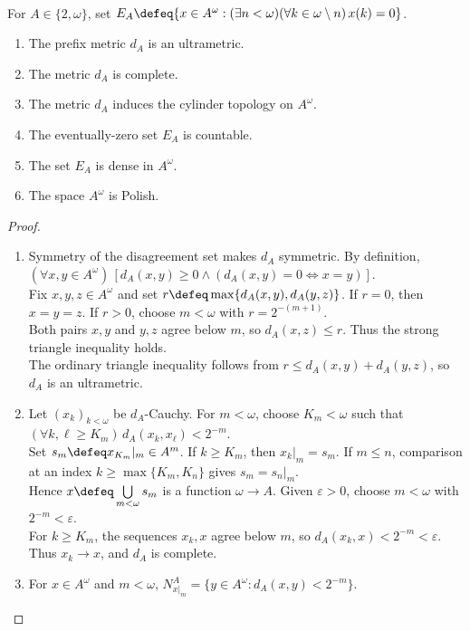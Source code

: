 \begin{theorem} \label{thm:baire-and-cantor-spaces-are-polish} \\
For $A\in\{2,\omega\}$, set $E_A\defeq\{x\in A^\omega:(\exists n<\omega)(\forall k\in\omega\setminus n)\,x(k)=0\}$.
\begin{enumerate}[label=(\roman*)]
\setlength{\itemsep}{0pt}
\item The prefix metric $d_A$ is an ultrametric.
\item The metric $d_A$ is complete.
\item The metric $d_A$ induces the cylinder topology on $A^\omega$.
\item The eventually-zero set $E_A$ is countable.
\item The set $E_A$ is dense in $A^\omega$.
\item The space $A^\omega$ is Polish.
\end{enumerate}
\begin{proof}
\begin{enumerate}[label=(\roman*)]
\setlength{\itemsep}{0pt}
\item Symmetry of the disagreement set makes $d_A$ symmetric. By definition, $(\forall x,y\in A^\omega)\,[d_A(x,y)\geq0\land(d_A(x,y)=0\Longleftrightarrow x=y)]$.\\
Fix $x,y,z\in A^\omega$ and set $r\defeq\max\{d_A(x,y),d_A(y,z)\}$. If $r=0$, then $x=y=z$. If $r>0$, choose $m<\omega$ with $r=2^{-(m+1)}$.\\
Both pairs $x,y$ and $y,z$ agree below $m$, so $d_A(x,z)\leq r$. Thus the strong triangle inequality holds.\\
The ordinary triangle inequality follows from $r\leq d_A(x,y)+d_A(y,z)$, so $d_A$ is an ultrametric.
\item Let $(x_k)_{k<\omega}$ be $d_A$-Cauchy. For $m<\omega$, choose $K_m<\omega$ such that $(\forall k,\ell\geq K_m)\,d_A(x_k,x_\ell)<2^{-m}$.\\
Set $s_m\defeq x_{K_m}|_m\in A^m$. If $k\geq K_m$, then $x_k|_m=s_m$. If $m\leq n$, comparison at an index $k\geq\max\{K_m,K_n\}$ gives $s_m=s_n|_m$.\\
Hence $x\defeq\bigcup\limits_{m<\omega}s_m$ is a function $\omega\to A$. Given $\varepsilon>0$, choose $m<\omega$ with $2^{-m}<\varepsilon$.\\
For $k\geq K_m$, the sequences $x_k,x$ agree below $m$, so $d_A(x_k,x)<2^{-m}<\varepsilon$. Thus $x_k\to x$, and $d_A$ is complete.
\item For $x\in A^\omega$ and $m<\omega$, $N_{x|_m}^A=\{y\in A^\omega:d_A(x,y)<2^{-m}\}$.\\

\end{enumerate}
\end{proof}
\end{theorem}
